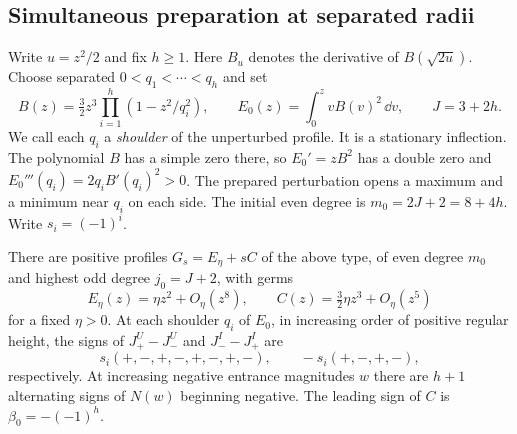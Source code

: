 \subsection{Simultaneous preparation at separated radii}
Write $u=z^2/2$ and fix $h\ge1$. Here $B_u$ denotes the derivative of $B(\sqrt{2u})$. Choose separated $0<q_1<\cdots<q_h$
and set
\[
 B(z)=\tfrac32 z^3\prod_{i=1}^h(1-z^2/q_i^2),\qquad
 E_0(z)=\int_0^z vB(v)^2\,\dd v,\qquad J=3+2h .
\]
We call each $q_i$ a \emph{shoulder} of the unperturbed profile.
It is a stationary inflection. The polynomial $B$ has a simple zero there, so $E_0'=zB^2$
has a double zero and $E_0'''(q_i)=2q_i B'(q_i)^2>0$. The prepared
perturbation opens a maximum and a minimum near $q_i$ on each side.
The initial even degree is $m_0=2J+2=8+4h$. Write $s_i=(-1)^i$.

\begin{lemma}\label{lem:remote-base}
There are positive profiles $G_s=E_\eta+sC$ of the above type, of even degree
$m_0$ and highest odd degree $j_0=J+2$, with germs
\[
 E_\eta(z)=\eta z^2+O_\eta(z^8),\qquad
 C(z)=\tfrac32\eta z^3+O_\eta(z^5)
\]
for a fixed $\eta>0$. At each shoulder $q_i$ of $E_0$, in increasing order of
positive regular height, the signs of $J_+^U-J_-^U$ and $J_-^I-J_+^I$ are
\[
 s_i(+,-,+,-,+,-,+,-),\qquad -s_i(+,-,+,-),
\]
respectively. At increasing negative entrance magnitudes $w$ there are
$h+1$ alternating signs of $N(w)$ beginning negative. The leading sign
of $C$ is $\beta_0=-(-1)^h$.
\end{lemma}
